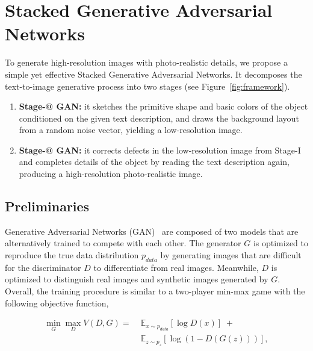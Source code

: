 \section{Stacked Generative Adversarial Networks}

To generate high-resolution images with photo-realistic details, we propose a simple yet effective Stacked Generative Adversarial Networks. It decomposes the text-to-image generative process into two stages (see Figure~\ref{fig:framework}).

\begin{enumerate}
\item [-] \textbf{Stage-\expandafter\@slowromancap{}@ GAN:} it sketches the primitive shape and basic colors of the object conditioned on the given text description, and draws the background layout from a random noise vector, yielding a low-resolution image. 

\item [-] \textbf{Stage-\expandafter\@slowromancap{}@ GAN:} it corrects defects in the low-resolution image from Stage-I and completes details of the object by reading the text description again, producing a high-resolution photo-realistic image. 
\end{enumerate}

\subsection{Preliminaries}

Generative Adversarial Networks (GAN)~\cite{goodfellow2014generative} are composed of two models that are alternatively trained to compete with each other. The generator $G$ is optimized to reproduce the true data distribution $p_{data}$ by generating images that are difficult for the discriminator $D$ to differentiate from real images. Meanwhile, $D$ is optimized to distinguish real images and synthetic images generated by $G$. Overall, the training procedure is similar to a two-player min-max game with the following objective function,

\begin{equation}\label{eq:GAN_ori}
\begin{aligned}
\min_{G} \max_{D} V(D,G) = \; & \mathbb{E}_{x \sim {p_{data}}} [\log D(x)] \; + \\
& \mathbb{E}_{z \sim {p_{z}}} [\log(1 - D(G(z)))],
\end{aligned}
\end{equation}

